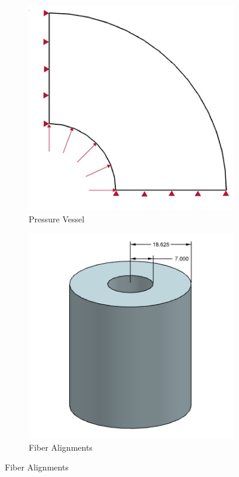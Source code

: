 \begin{figure}[t!p]
	\centering
	\begin{subfigure}[b]{0.4\textwidth}
		\centering
		\includegraphics[width=\textwidth]{./figures/vessel_schematic.jpg}
		\caption{Pressure Vessel}
		\label{fig:vessel_schematic}
	\end{subfigure}
	\begin{subfigure}[b]{0.4\textwidth}
		\centering
		\includegraphics[width=\textwidth]{./figures/vessel_schematic2.png}
		\caption{Fiber Alignments}
		\label{fig:vessel_schematic2}
	\end{subfigure}
\end{figure}

